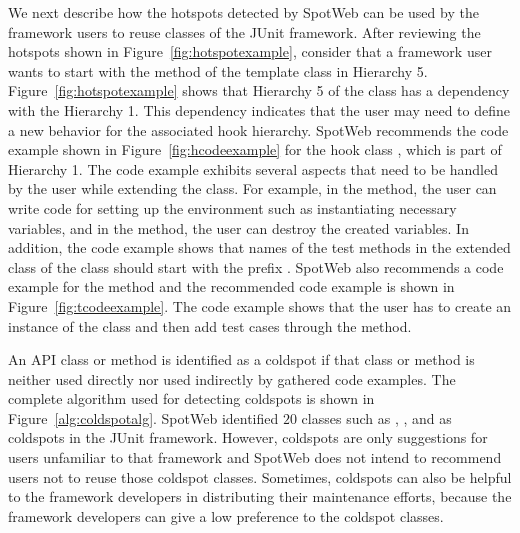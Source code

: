 We next describe how the hotspots detected by SpotWeb can be used by
the framework users to reuse classes of the JUnit framework. After reviewing
the hotspots shown in Figure~\ref{fig:hotspotexample}, consider that
a framework user wants to start with the method  of
the template class  in Hierarchy 5.
Figure~\ref{fig:hotspotexample} shows that Hierarchy 5 of the
 class has a  dependency
with the Hierarchy 1. This dependency indicates that the user may
need to define a new behavior for the associated hook hierarchy.
SpotWeb recommends the code example shown in
Figure~\ref{fig:hcodeexample} for the hook class ,
which is part of Hierarchy 1. The code example exhibits several
aspects that need to be handled by the user while extending the
 class. For example, in the  method,
the user can write code for setting up the environment such as
instantiating necessary variables, and in the 
method, the user can destroy the created variables. In addition, the code
example shows that names of the test methods in the extended class
of the  class should start with the prefix .
SpotWeb also recommends a code example for the  method and
the recommended code example is shown in
Figure~\ref{fig:tcodeexample}. The code example shows that the user
has to create an instance of the  class and then
add test cases through the  method.

An API class or method is identified as a coldspot if that class or method is neither
used directly nor used indirectly by gathered code examples. The complete
algorithm used for detecting coldspots is shown in Figure~\ref{alg:coldspotalg}. SpotWeb identified $20$
classes such as , , and  as coldspots
in the JUnit framework. However, coldspots are only suggestions
for users unfamiliar to that framework and SpotWeb does not intend to recommend users not to reuse
those coldspot classes. Sometimes, coldspots can also be helpful to
the framework developers in distributing their maintenance efforts, because the framework
developers can give a low preference to the coldspot classes.
